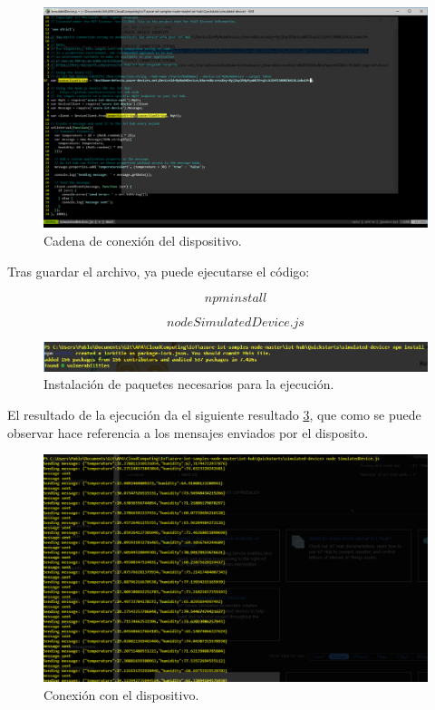 \documentclass[10pt]{article}
\begin{document}
\begin{figure}[h!]
 \includegraphics[width=\linewidth]{./IoT/MicrosoftAzure/4-2_send_simulated_telemetry.png}
 \caption{Cadena de conexión del dispositivo.}
 \label{codestring}
\end{figure}

Tras guardar el archivo, ya puede ejecutarse el código:

\begin{equation}
 \label{ejecdev1}
npm install
\end{equation}

\begin{equation}
 \label{ejecdev2}
node SimulatedDevice.js
\end{equation}

\begin{figure}[h!]
 \includegraphics[width=\linewidth]{./IoT/MicrosoftAzure/4-4_send_simulated_telemetry.png}
 \caption{Instalación de paquetes necesarios para la ejecución.}
 \label{npmdev}
\end{figure}

El resultado de la ejecución da el siguiente resultado
\hyperref[nodedev]{\ref{nodedev}}, que como se puede observar hace referencia a 
los mensajes enviados por el disposito.

\begin{figure}[h!]
 \includegraphics[width=\linewidth]{./IoT/MicrosoftAzure/4-5_send_simulated_telemetry.png}
 \caption{Conexión con el dispositivo.}
 \label{nodedev}
\end{figure}
\end{document}
